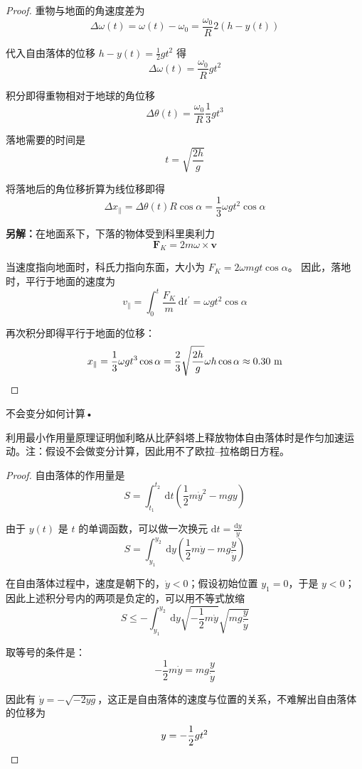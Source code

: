 \begin{proof}
重物与地面的角速度差为
$$\Delta \omega(t)=\omega(t)-\omega_{0}=\frac{\omega_{0}}{R} 2(h-y(t))$$

代入自由落体的位移 $h-y(t)=\frac{1}{2} g t^{2}$ 得
$$\Delta \omega(t)=\frac{\omega_{0}}{R} g t^{2}$$

积分即得重物相对于地球的角位移
$$\Delta \theta(t)=\frac{\omega_{0}}{R} \frac{1}{3} g t^{3}$$

落地需要的时间是
$$t=\sqrt{\frac{2h}{g}}$$

将落地后的角位移折算为线位移即得
$$\Delta x_{\|}=\Delta \theta(t) R \cos \alpha
=\frac{1}{3} \omega g t^{2} \cos \alpha$$



\textbf{另解：}在地面系下，下落的物体受到科里奥利力
$$\mathbf{F}_{K}=2 m \omega \times \mathbf{v}$$

当速度指向地面时，科氏力指向东面，大小为 $F_{K}=2 \omega m g t \cos \alpha$。
因此，落地时，平行于地面的速度为
$$v_{\|}=\int_{0}^{t} \frac{F_{K}}{m} \mathrm{~d} t^{\prime}
=\omega g t^{2} \cos \alpha$$

再次积分即得平行于地面的位移：
$$x_{\|}=\frac{1}{3} \omega g t^{3} \cos \alpha
=\frac{2}{3} \sqrt{\frac{2h}{g}} \omega h \cos \alpha \approx 0.30 \mathrm{~m}\qedhere$$
\end{proof}
\begin{2}
    不会变分如何计算•

利用最小作用量原理证明伽利略从比萨斜塔上释放物体自由落体时是作匀加速运动。注：假设不会做变分计算，因此用不了欧拉--拉格朗日方程。
\end{2}
\begin{proof}
自由落体的作用量是
$$S=\int_{t_{1}}^{t_{2}} \mathrm{~d} t\left(\frac{1}{2} m \dot{y}^{2}-m g y\right)$$

由于 $y(t)$ 是 $t$ 的单调函数，可以做一次换元 $\mathrm{d} t=\frac{\mathrm{d} y}{\dot{y}}$
$$S=\int_{y_{1}}^{y_{2}} \mathrm{~d} y\left(\frac{1}{2} m \dot{y}-m g \frac{y}{\dot{y}}\right)$$

在自由落体过程中，速度是朝下的，$\dot{y}<0$；假设初始位置 $y_{1}=0$，于是 $y<0$；因此上述积分号内的两项是负定的，可以用不等式放缩
$$S \leq-\int_{y_{1}}^{y_{2}} \mathrm{~d} y \sqrt{-\frac{1}{2} m \dot{y}} \sqrt{m g \frac{y}{\dot{y}}}$$

取等号的条件是：
$$-\frac{1}{2} m \dot{y}=m g \frac{y}{\dot{y}}$$

因此有 $\dot{y}=-\sqrt{-2 y g}$，这正是自由落体的速度与位置的关系，不难解出自由落体的位移为
$$y=-\frac{1}{2} g t^{2}\qedhere$$
\end{proof}

